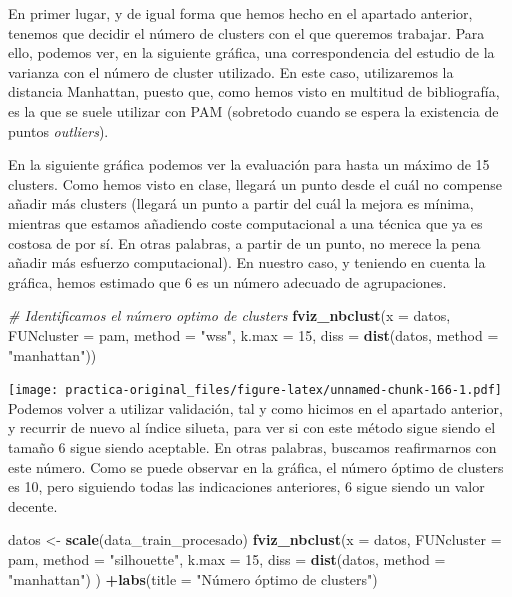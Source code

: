 \documentclass[spanish,]{article}
\newenvironment{Shaded}{\begin{snugshade}}{\end{snugshade}}
\newcommand{\KeywordTok}[1]{\textcolor[rgb]{0.13,0.29,0.53}{\textbf{#1}}}
\newcommand{\DataTypeTok}[1]{\textcolor[rgb]{0.13,0.29,0.53}{#1}}
\newcommand{\DecValTok}[1]{\textcolor[rgb]{0.00,0.00,0.81}{#1}}
\newcommand{\StringTok}[1]{\textcolor[rgb]{0.31,0.60,0.02}{#1}}
\newcommand{\CommentTok}[1]{\textcolor[rgb]{0.56,0.35,0.01}{\textit{#1}}}
\newcommand{\OperatorTok}[1]{\textcolor[rgb]{0.81,0.36,0.00}{\textbf{#1}}}
\newcommand{\NormalTok}[1]{#1}
\begin{document}
En primer lugar, y de igual forma que hemos hecho en el apartado
anterior, tenemos que decidir el número de clusters con el que queremos
trabajar. Para ello, podemos ver, en la siguiente gráfica, una
correspondencia del estudio de la varianza con el número de cluster
utilizado. En este caso, utilizaremos la distancia Manhattan, puesto
que, como hemos visto en multitud de bibliografía, es la que se suele
utilizar con PAM (sobretodo cuando se espera la existencia de puntos
\emph{outliers}).

En la siguiente gráfica podemos ver la evaluación para hasta un máximo
de 15 clusters. Como hemos visto en clase, llegará un punto desde el
cuál no compense añadir más clusters (llegará un punto a partir del cuál
la mejora es mínima, mientras que estamos añadiendo coste computacional
a una técnica que ya es costosa de por sí. En otras palabras, a partir
de un punto, no merece la pena añadir más esfuerzo computacional). En
nuestro caso, y teniendo en cuenta la gráfica, hemos estimado que 6 es
un número adecuado de agrupaciones.

\begin{Shaded}
\begin{Highlighting}[]
\CommentTok{# Identificamos el número optimo de clusters}
\KeywordTok{fviz_nbclust}\NormalTok{(}\DataTypeTok{x =}\NormalTok{ datos, }\DataTypeTok{FUNcluster =}\NormalTok{ pam, }\DataTypeTok{method =} \StringTok{"wss"}\NormalTok{, }\DataTypeTok{k.max =} \DecValTok{15}\NormalTok{,}
             \DataTypeTok{diss =} \KeywordTok{dist}\NormalTok{(datos, }\DataTypeTok{method =} \StringTok{"manhattan"}\NormalTok{))}
\end{Highlighting}
\end{Shaded}

\texttt{[image: practica-original\_files/figure-latex/unnamed-chunk-166-1.pdf]}
Podemos volver a utilizar validación, tal y como hicimos en el apartado
anterior, y recurrir de nuevo al índice silueta, para ver si con este
método sigue siendo el tamaño 6 sigue siendo aceptable. En otras
palabras, buscamos reafirmarnos con este número. Como se puede observar
en la gráfica, el número óptimo de clusters es 10, pero siguiendo todas
las indicaciones anteriores, 6 sigue siendo un valor decente.

\begin{Shaded}
\begin{Highlighting}[]
\NormalTok{datos <-}\StringTok{ }\KeywordTok{scale}\NormalTok{(data_train_procesado)}
\KeywordTok{fviz_nbclust}\NormalTok{(}\DataTypeTok{x =}\NormalTok{ datos, }\DataTypeTok{FUNcluster =}\NormalTok{ pam, }\DataTypeTok{method =} \StringTok{"silhouette"}\NormalTok{, }\DataTypeTok{k.max =} \DecValTok{15}\NormalTok{,}
             \DataTypeTok{diss =} \KeywordTok{dist}\NormalTok{(datos, }\DataTypeTok{method =} \StringTok{"manhattan"}\NormalTok{) ) }\OperatorTok{+}\KeywordTok{labs}\NormalTok{(}\DataTypeTok{title =} \StringTok{"Número óptimo de clusters"}\NormalTok{)}
\end{Highlighting}
\end{Shaded}
\end{document}
